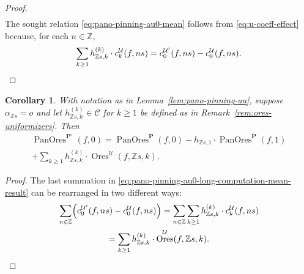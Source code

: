 \documentclass[preprint,12pt]{elsarticle}
\numberwithin{equation}{section} %
\theoremstyle{theorem}
\newtheorem{corollary}[theorem]{Corollary}
\theoremstyle{definition}
\newcommand{\Ca}{\mathcal{C}} %
\newcommand{\idec}{{o}} %
\newcommand{\Z}{\mathbb{Z}} %
\DeclareMathOperator{\ores}{Ores}
\DeclareMathOperator{\pano}{PanOres}
\begin{document}
\begin{proof}
\begin{multline}
\end{multline}The sought relation \eqref{eq:pano-pinning-au0-mean} follows from \eqref{eq:u-coeff-effect} because, for each $n\in\Z$, \[\sum_{k\geq 1}h^{(k)}_{\Z s,k}\cdot c^\mathcal{U}_k(f,ns)=c^{\mathcal{U}'}_0(f,ns)-c_0^\mathcal{U}(f,ns).\qedhere\]
\end{proof}

\begin{corollary}\label{cor:pano-pinning-au}
    With notation as in Lemma~\ref{lem:pano-pinning-au}, suppose $\alpha_{\Z s}=\idec$ and let $h^{(k)}_{\Z s,k}\in\Ca$ for $k\geq 1$ be defined as in Remark~\ref{rem:ores-uniformizers}. Then \begin{multline}\label{eq:pano-pinning-au0-alt}
        \pano^{\mathbf{P}'}(f,0)=\pano^\mathbf{P}(f,0)-h_{\Z s,1}\cdot\pano^\mathbf{P}(f,1)\\+\sum_{k\geq 1}h^{(k)}_{\Z s,k}\cdot\ores^{\mathcal{U}}(f,\Z s,k).
    \end{multline}
\end{corollary}

\begin{proof}
    The last summation in \eqref{eq:pano-pinning-au0-long-computation-mean-result} can be rearranged in two different ways:\begin{multline*}\sum_{n\in\Z}\Bigl(c^{\mathcal{U}'}_0(f,ns)-c^{\mathcal{U}}_0(f, ns)\Bigr)=\sum_{n\in\Z}\sum_{k\geq 1}h^{(k)}_{\Z s,k}\cdot c^\mathcal{U}_k(f,ns)\\=\sum_{k\geq 1}h^{(k)}_{\Z s,k}\cdot\ores^\mathcal{U}(f,\Z s,k).\qedhere\end{multline*}
\end{proof}
\end{document}
